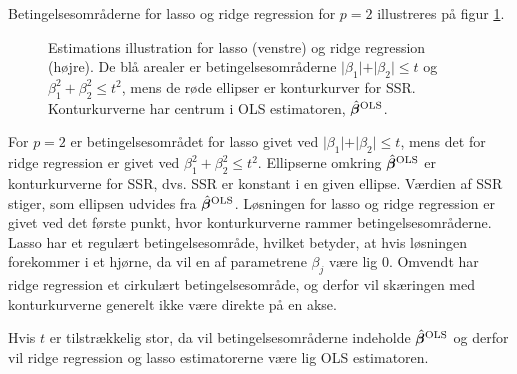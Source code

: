 Betingelsesområderne for lasso og ridge regression for \(p=2\) illustreres på figur \ref{fig:LassoRig}.
%
\begin{figure}[H]
\centering
\begin{minipage}{0.4\linewidth}
\scalebox{0.7}{}
\end{minipage}
\hspace{0.2cm}
\begin{minipage}{0.4\linewidth}
\scalebox{0.7}{}
\end{minipage}
\caption{Estimations illustration for lasso (venstre) og ridge regression (højre). 
De blå arealer er betingelsesområderne $\vert \beta_1 \vert+\vert \beta_2 \vert \leq t$ og $\beta_1^2+\beta_2^2 \leq t^2$, mens de røde ellipser er konturkurver for SSR. Konturkurverne har centrum i OLS estimatoren, $\hat{\boldsymbol{\beta}}^\text{OLS}$.} \label{fig:LassoRig}
\end{figure}
%
For $p=2$ er betingelsesområdet for lasso givet ved $\vert \beta_1 \vert + \vert \beta_2 \vert \leq t$, mens det for ridge regression er givet ved $\beta_1^2 + \beta_2^2 \leq t^2$.
Ellipserne omkring $\hat{\boldsymbol{\beta}}^{\text{OLS}}$ er konturkurverne for SSR, dvs. SSR er konstant i en given ellipse. Værdien af SSR stiger, som ellipsen udvides fra $\hat{\boldsymbol{\beta}}^{\text{OLS}}$.
Løsningen for lasso og ridge regression er givet ved det første punkt, hvor konturkurverne rammer betingelsesområderne.
Lasso har et regulært betingelsesområde, hvilket betyder, at hvis løsningen forekommer i et hjørne, da vil en af parametrene $\beta_j$ være lig 0.
Omvendt har ridge regression et cirkulært betingelsesområde, og derfor vil skæringen med konturkurverne generelt ikke være direkte på en akse.

Hvis $t$ er tilstrækkelig stor, da vil betingelsesområderne indeholde $\hat{\boldsymbol{\beta}}^{\text{OLS}}$ og derfor vil ridge regression og lasso estimatorerne være lig OLS estimatoren.

